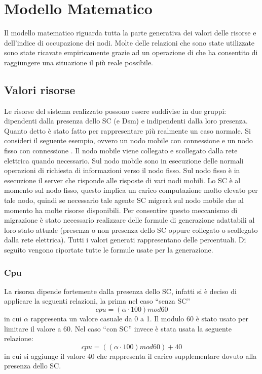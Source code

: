 \chapter{Modello Matematico}\label{cap:modello}
Il modello matematico riguarda tutta la parte generativa dei valori delle risorse e dell'indice di occupazione dei nodi. Molte delle relazioni che sono state utilizzate sono state ricavate empiricamente grazie ad un operazione di  che ha consentito di raggiungere una situazione il più reale possibile.
\section{Valori risorse}
Le risorse del sistema realizzato possono essere suddivise in due gruppi: dipendenti dalla presenza dello SC (e Dsm) e indipendenti dalla loro presenza. Quanto detto è stato fatto per rappresentare più realmente un caso normale. Si consideri il seguente esempio, ovvero un nodo mobile con connessione  e un nodo fisso con connessione . Il nodo mobile viene collegato e scollegato dalla rete elettrica quando necessario. Sul nodo mobile sono in esecuzione delle normali operazioni di richiesta di informazioni verso il nodo fisso. Sul nodo fisso è in esecuzione il server che risponde alle risposte di vari nodi mobili. Lo SC è al momento sul nodo fisso, questo implica un carico computazione molto elevato per tale nodo, quindi se necessario tale agente SC migrerà sul nodo mobile che al momento ha molte risorse disponibili. Per consentire questo meccanismo di migrazione è stato necessario realizzare delle formule di generazione adattabili al loro stato attuale (presenza o non presenza dello SC oppure collegato o scollegato dalla rete elettrica). Tutti i valori generati rappresentano delle percentuali. Di seguito vengono riportate tutte le formule usate per la generazione.
\subsection{Cpu}
La risorsa  dipende fortemente dalla presenza dello SC, infatti si è deciso di applicare la seguenti relazioni, la prima nel caso ``senza SC''
\begin{equation}
cpu = (\alpha \cdot 100) mod 60
\end{equation}
in cui $\alpha$ rappresenta un valore casuale da 0 a 1. Il modulo 60 è stato usato per limitare il valore a 60. Nel caso ``con SC'' invece è stata usata la seguente relazione:
\begin{equation}
cpu = ((\alpha \cdot 100) mod 60) + 40
\end{equation}
in cui si aggiunge il valore 40 che rappresenta il carico supplementare dovuto alla presenza dello SC.
